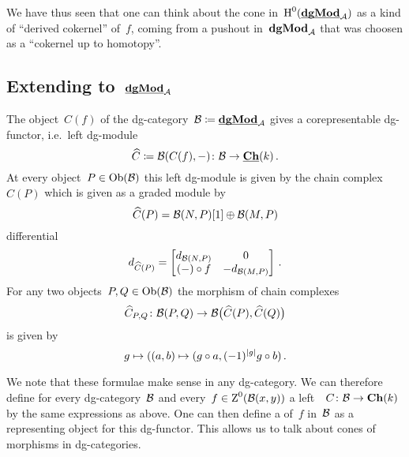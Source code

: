 \documentclass[a4paper,10pt]{scrartcl}
\begin{document}
We have thus seen that one can think about the cone in~$\operatorname{H}^0(\underline{\smash{\mathbf{dgMod}}}_{\mathcal{A}})$ as a kind of \enquote{derived cokernel} of~$f$, coming from a pushout in~$\mathbf{dgMod}_{\mathcal{A}}$ that was choosen as a \enquote{cokernel up to homotopy}.



\subsection{Extending to~$\underline{\smash{\mathbf{dgMod}}}_{\mathcal{A}}$}

The object~$C(f)$ of the dg-category~$\mathcal{B} \coloneqq \underline{\smash{\mathbf{dgMod}}}_{\mathcal{A}}$ gives a corepresentable dg-functor, i.e.~left dg-module
\[
  \widehat{C}
  \coloneqq
  \mathcal{B}(C(f), -)
  \colon
  \mathcal{B}
  \to
  \underline{\mathbf{Ch}}(k) \,.
\]
At every object~$P \in \operatorname{Ob}(\mathcal{B})$ this left dg-module is given by the chain complex~$\widehat{C}(P)$ which is given as a graded module by
\[
  \widehat{C}(P)
  =
  \mathcal{B}(N,P)[1] \oplus \mathcal{B}(M,P)
\]
differential
\[
  d_{\widehat{C}(P)}
  =
  \begin{bmatrix}
    d_{\mathcal{B}(N,P)} &  0               \\
    (-) \circ f    & -d_{\mathcal{B}(M,P)}
  \end{bmatrix} \,.
\]
For any two objects~$P, Q \in \operatorname{Ob}(\mathcal{B})$ the morphism of chain complexes
\[
  \widehat{C}_{P,Q}
  \colon
  \mathcal{B}(P,Q)
  \to
  \mathcal{B}\bigl( \widehat{C}(P), \widehat{C}(Q) \bigr)
\]
is given by
\[
  g
  \mapsto
  ((a,b) \mapsto (g \circ a, (-1)^{\lvert g\rvert} g \circ b) \,.
\]

We note that these formulae make sense in any dg-category.
We can therefore define for every dg-category~$\Bcat$ and every~$f \in \operatorname{Z}^0(\mathcal{B}(x,y))$ a left~{\dgmodule{$\Bcat$}}~$C \colon \mathcal{B} \to \mathbf{Ch}(k)$ by the same expressions as above.
One can then define a  of~$f$ in~$\Bcat$ as a representing object for this dg-functor.
This allows us to talk about cones of morphisms in dg-categories.
\end{document}
